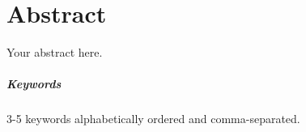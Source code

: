 \chapter*{Abstract}
\thispagestyle{title_on_header}

Your abstract here.

\paragraph{Keywords} 3-5 keywords alphabetically ordered and comma-separated.